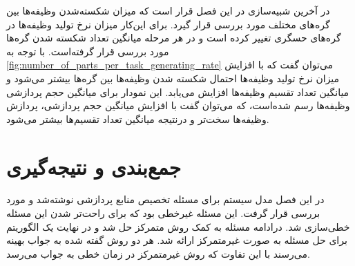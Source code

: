 	در آخرین شبیه‌سازی در این فصل قرار است که میزان شکسته‌شدن وظیفه‌ها بین گره‌های مختلف مورد بررسی قرار گیرد. برای این‌کار میزان نرخ تولید وظیفه‌ها در گره‌های حسگری تغییر کرده است و در هر مرحله میانگین تعداد شکسته شدن گره‌ها مورد بررسی قرار گرفته‌است. با توجه به \cref{fig:number_of_parts_per_task_generating_rate} می‌توان گفت که با افزایش میزان نرخ تولید وظیفه‌ها احتمال شکسته شدن وظیفه‌ها بین گره‌ها بیشتر می‌شود و میانگین تعداد تقسیم وظیفه‌ها افزایش می‌یابد. این نمودار برای میانگین حجم پردازشی وظیفه‌ها رسم شده‌است، که می‌توان گفت با افزایش میانگین حجم پردازشی، پردازش وظیفه‌ها سخت‌تر و درنتیجه میانگین تعداد تقسیم‌ها بیشتر می‌شود. 

	\section{جمع‌بندی و نتیجه‌گیری}
	در این فصل مدل سیستم برای مسئله تخصیص منابع پردازشی نوشته‌شد و مورد بررسی قرار گرفت. این مسئله غیرخطی بود که برای راحت‌تر شدن این مسئله خطی‌سازی شد. درادامه مسئله به کمک روش متمرکز حل شد و در نهایت یک الگوریتم برای حل مسئله به صورت غیرمتمرکز ارائه شد. هر دو روش گفته شده به جواب بهینه می‌رسند با این تفاوت که روش غیرمتمرکز در زمان خطی به جواب می‌رسد. 



